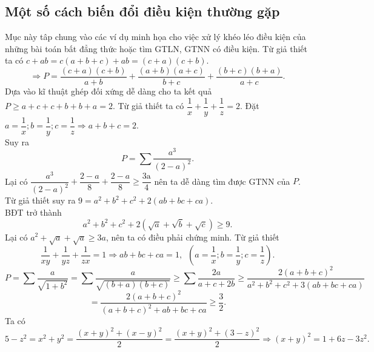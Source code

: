 \subsection{Một số cách biến đổi điều kiện thường gặp}
Mục này tâp chung vào các ví dụ minh họa cho việc xử lý khéo léo điều kiện của những bài toán bất đẳng thức hoặc tìm GTLN, GTNN có điều kiện.
\hda  Từ giả thiết ta có $c+ab=c\left( a+b+c \right)+ab=\left( c+a \right)\left( c+b \right)$.
\[\Rightarrow P=\frac{\left( c+a \right)\left( c+b \right)}{a+b}+\frac{\left( a+b \right)\left( a+c \right)}{b+c}+\frac{\left( b+c \right)\left( b+a \right)}{a+c}.\]
Dựa vào kĩ thuật ghép đối xứng dễ dàng cho ta kết quả $P\ge a+c+c+b+b+a=2$.
\hda  Từ giả thiết ta có $\dfrac{1}{x}+\dfrac{1}{y}+\dfrac{1}{z}=2$. Đặt $a=\dfrac{1}{x};b=\dfrac{1}{y};c=\dfrac{1}{z}\Rightarrow a+b+c=2$.\\
Suy ra \[P=\sum{\frac{{{a}^{3}}}{{{\left( 2-a \right)}^{2}}}.}\]
Lại có $\dfrac{{{a}^{3}}}{{{\left( 2-a \right)}^{2}}}+\dfrac{2-a}{8}+\dfrac{2-a}{8}\ge \dfrac{3\text{a}}{4}$ nên ta dễ dàng tìm được GTNN của $P$.
\hda  Từ giả thiết suy ra $9={{a}^{2}}+{{b}^{2}}+{{c}^{2}}+2\left( ab+bc+ca \right)$.\\
BĐT trở thành \[{{a}^{2}}+{{b}^{2}}+{{c}^{2}}+2\left( \sqrt{a}+\sqrt{b}+\sqrt{c} \right)\ge 9.\] 
Lại có ${{a}^{2}}+\sqrt{a}+\sqrt{a}\ge 3a$, nên ta có điều phải chứng minh. 
\hda  Từ giả thiết \[\frac{1}{xy}+\frac{1}{yz}+\frac{1}{zx}=1\Rightarrow ab+bc+ca=1,\,\,\,\left( a=\frac{1}{x};b=\frac{1}{y};c=\frac{1}{z} \right).\]
\[P=\sum{\frac{a}{\sqrt{1+{{b}^{2}}}}=\sum{\frac{a}{\sqrt{\left( b+a \right)\left( b+c \right)}}\ge \sum{\frac{2a}{a+c+2b}}\ge \frac{2{{\left( a+b+c \right)}^{2}}}{{{a}^{2}}+{{b}^{2}}+{{c}^{2}}+3\left( ab+bc+ca \right)}}}\]
\[=\frac{2{{\left( a+b+c \right)}^{2}}}{{{\left( a+b+c \right)}^{2}}+ab+bc+ca}\ge \frac{3}{2}.\]
\hda  Ta có \[5-{{z}^{2}}={{x}^{2}}+{{y}^{2}}=\frac{{{\left( x+y \right)}^{2}}+{{\left( x-y \right)}^{2}}}{2}=\frac{{{\left( x+y \right)}^{2}}+{{\left( 3-z \right)}^{2}}}{2}\Rightarrow {{\left( x+y \right)}^{2}}=1+6z-3{{z}^{2}}.\]
